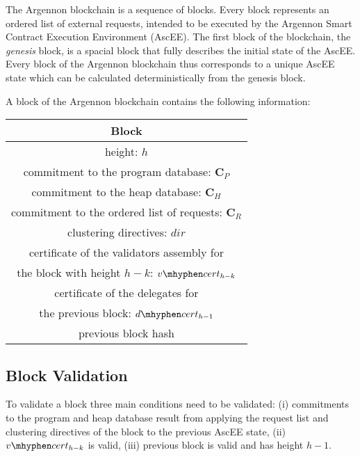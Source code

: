 
The Argennon blockchain is a sequence of blocks. Every block represents an ordered list of external requests, intended
to be executed by the Argennon Smart Contract Execution Environment (AscEE). The first block of the blockchain, the
\emph{genesis} block, is a spacial block that fully describes the initial state of the AscEE. Every block of the
Argennon blockchain thus corresponds to a unique AscEE state which can be calculated deterministically from the genesis
block.

A block of the Argennon blockchain contains the following information:

\begin{center}
    \begin{tabular}{||c||}
        \hline
        \textbf{Block} \\ [0.6ex]
        \hline\hline
        height: $h$                          \\ [1.2ex]
        commitment to the program database: $\mathbf{C}_{P}$             \\ [1.2ex]
        commitment to the heap database: $\mathbf{C}_{H}$               \\ [1.2ex]
        commitment to the ordered list of requests: $\mathbf{C}_{R}$        \\ [1.2ex]
        clustering directives: $dir$                        \\ [1.2ex]
        certificate of the validators assembly for \\
        the block with height $h - k$: $v \mhyphen cert_{h-k}$         \\ [1.2ex]
        certificate of the delegates for\\
        the previous block: $d \mhyphen cert_{h-1}$        \\ [1.2ex]
        previous block hash                           \\ [1.2ex]
        \hline
    \end{tabular}
\end{center}

\subsection{Block Validation}\label{subsec:block-validation}

To validate a block three main conditions need to be validated: (i) commitments to the program and heap
database result from applying the request list and clustering directives of the block to the previous AscEE
state, (ii) $v \mhyphen cert_{h-k}$ is valid, (iii) previous block is valid and has height $h - 1$.

